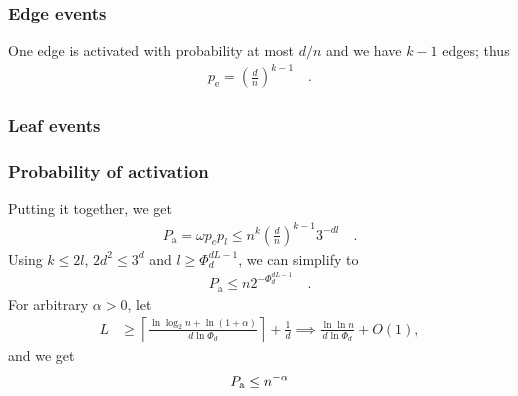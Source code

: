 \documentclass[serif,professionalfonts]{beamer}
\newcommand\xqed[1]{%
   \rlap{\hbox to#1{\hfil\llap{\ensuremath{\qed}}}}
}
\begin{document}
\begin{frame}
\frametitle{Edge events}
\bigskip
One edge is activated with probability at most $d/n$ and we have $k-1$ edges; thus
\begin{align*}
p_\mathrm{e} = \left(\frac{d}{n}\right)^{k-1} \quad .
\end{align*}
\end{frame}

\begin{frame}
\frametitle{Leaf events}

\end{frame}

\begin{frame}
\frametitle{Probability of activation}
Putting it together, we get
\begin{align*}
P_\mathrm{a} = \omega p_e p_l \leq  n^k \left(\frac{d}{n}\right)^{k-1} 3^{-dl} \quad .
\end{align*}
Using $ k\leq 2l$, $2d^2\leq 3^d$ and $l \geq \Phi_d^{dL-1}$, we can simplify to
\begin{align*}
P_\mathrm{a} \leq n 2 ^{-\Phi_d^{dL-1}} \quad .
\end{align*}
For arbitrary $\alpha > 0$, let
\begin{align*}
L &\geq \left\lceil{\frac{\ln\log_2 n + \ln\left(1+\alpha\right)}{d \ln \Phi_d}}\right\rceil+\frac{1}{d} \implies \frac{\ln\ln n}{d \ln \Phi_d} + O\left(1\right) ,
\end{align*}
and we get
\begin{align*}
P_\mathrm{a} \leq n^{-\alpha} \xqed{5cm}
\end{align*}
\end{frame}
\end{document}
